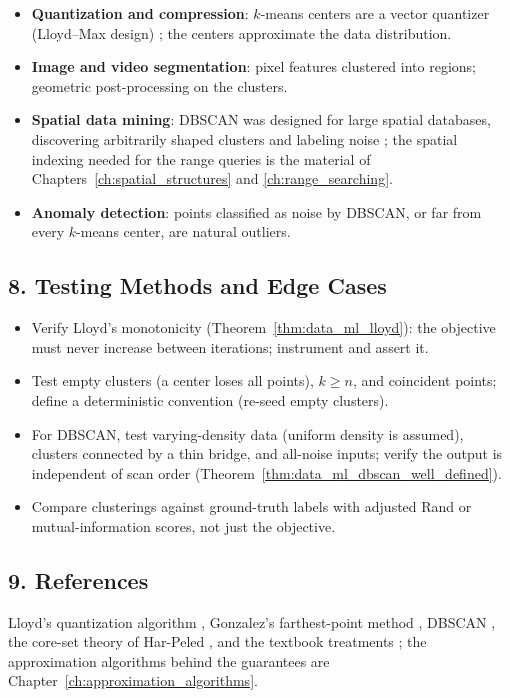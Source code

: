 \begin{itemize}
\item \textbf{Quantization and compression}: $k$-means centers are a
  vector quantizer (Lloyd--Max design) \cite{lloyd1982}; the centers
  approximate the data distribution.
\item \textbf{Image and video segmentation}: pixel features clustered into
  regions; geometric post-processing on the clusters.
\item \textbf{Spatial data mining}: DBSCAN was designed for large spatial
  databases, discovering arbitrarily shaped clusters and labeling noise
  \cite{ester1996}; the spatial indexing needed for the range queries is the
  material of Chapters~\ref{ch:spatial_structures} and \ref{ch:range_searching}.
\item \textbf{Anomaly detection}: points classified as noise by DBSCAN, or
  far from every $k$-means center, are natural outliers.
\end{itemize}

\subsection{8. Testing Methods and Edge Cases}

\begin{itemize}
\item Verify Lloyd's monotonicity (Theorem~\ref{thm:data_ml_lloyd}): the
  objective must never increase between iterations; instrument and assert
  it.
\item Test empty clusters (a center loses all points), $k \geq n$, and
  coincident points; define a deterministic convention (re-seed empty
  clusters).
\item For DBSCAN, test varying-density data (uniform density is assumed),
  clusters connected by a thin bridge, and all-noise inputs; verify the
  output is independent of scan order
  (Theorem~\ref{thm:data_ml_dbscan_well_defined}).
\item Compare clusterings against ground-truth labels with adjusted Rand or
  mutual-information scores, not just the objective.
\end{itemize}

\subsection{9. References}

Lloyd's quantization algorithm \cite{lloyd1982}, Gonzalez's farthest-point
method \cite{gonzalez1985}, DBSCAN \cite{ester1996}, the core-set theory of
Har-Peled \cite{harpeled2011}, and the textbook treatments
\cite{hastie2009,bishop2006}; the approximation algorithms behind the
guarantees are Chapter~\ref{ch:approximation_algorithms}.

